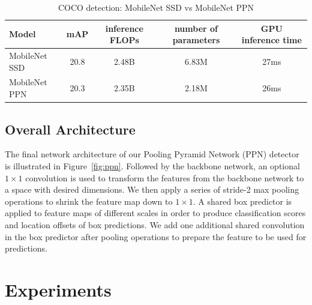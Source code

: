 \documentclass[10pt,twocolumn,letterpaper]{article}
\begin{document}

\begin{table}[t]
\begin{center}
\begin{tabular}{l|c|c|c|c}
Model & mAP & inference FLOPs & number of parameters & GPU inference time\\
\hline
\hline
MobileNet SSD & 20.8 & 2.48B & 6.83M & 27ms \\
\hline
MobileNet PPN & 20.3 & 2.35B & 2.18M & 26ms \\
\end{tabular}
\end{center}
\caption{COCO detection: MobileNet SSD vs MobileNet PPN}
\label{comparison}
\end{table}



\subsection{Overall Architecture}


The final network architecture of our Pooling Pyramid
Network (PPN) detector is illustrated in
Figure~\ref{fig:ppn}.  Followed by the backbone network, an
optional $1\times 1$ convolution is used to transform the features
from the backbone network to a space with desired
dimensions.  We then apply a series of stride-2 max pooling
operations to shrink the feature map down to $1\times 1$.  A shared
box predictor is applied to feature maps of different scales
in order to produce classification scores and location
offsets of box predictions.  We add one additional shared
convolution in the box predictor after pooling operations to
prepare the feature to be used for predictions.


\section{Experiments}
\end{document}
